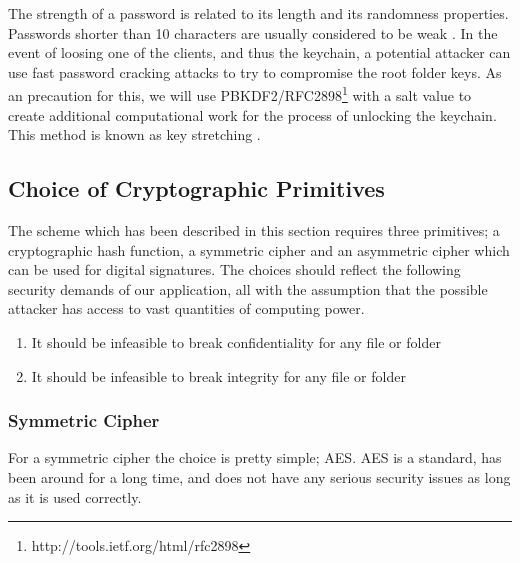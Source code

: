 \documentclass[pdftex,english,10pt,b5paper,twoside]{book}
\begin{document}
The strength of a password is related to its length and its randomness
properties. Passwords shorter than 10 characters are usually considered to be
weak \cite{pbkdf_nist}. In the event of loosing one of the clients, and thus
the keychain, a potential attacker can use fast password cracking attacks to
try to compromise the root folder keys. As an precaution for this, we will use
\ac{PBKDF2}/RFC2898\footnote{http://tools.ietf.org/html/rfc2898} with a salt
value to create additional computational work for the process of unlocking the
keychain. This method is known as key stretching \cite{keystretch}.

\subsection{Choice of Cryptographic Primitives}

The scheme which has been described in this section requires three primitives;
a cryptographic hash function, a symmetric cipher and an asymmetric cipher
which can be used for digital signatures. The choices should reflect the
following security demands of our application, all with the assumption that the
possible attacker has access to vast quantities of computing power.

\begin{enumerate}
    \item It should be infeasible to break confidentiality for any file or folder
    \item It should be infeasible to break integrity for any file or folder
\end{enumerate}

\subsubsection{Symmetric Cipher}
For a symmetric cipher the choice is pretty simple; \ac{AES}. \ac{AES} is
a standard, has been around for a long time, and does not have any serious
security issues as long as it is used correctly.

\end{document}
